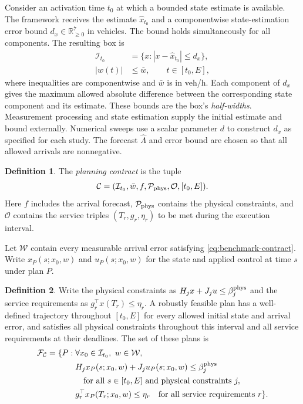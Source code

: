 \documentclass[preprint,12pt]{elsarticle}
\theoremstyle{definition}
\theoremstyle{plain}
\theoremstyle{definition}
\newtheorem{definition}{Definition}
\theoremstyle{plain}
\begin{document}
Consider an activation time $t_0$ at which a bounded state estimate is
available. The framework receives the estimate
$\widehat x_{t_0}$ and a componentwise state-estimation error bound
$d_x\in\mathbb R_{\ge0}^7$ in vehicles. The bound holds simultaneously
for all components. The resulting box is
\begin{equation}
\begin{aligned}
\mathcal I_{t_0}&=\{x:|x-\widehat x_{t_0}|\le d_x\},\\
|w(t)|&\le\bar w,\qquad t\in[t_0,E],
\end{aligned}
\label{eq:benchmark-contract}
\end{equation}
where inequalities are componentwise and $\bar w$ is in veh/h.
Each component of $d_x$ gives the maximum allowed absolute difference
between the corresponding state component and its estimate. These bounds
are the box's \emph{half-widths}. Measurement processing and state estimation
supply the initial estimate and bound externally. Numerical sweeps use a
scalar parameter $d$ to construct $d_x$ as specified for each study.
The forecast $\widehat\Lambda$ and error bound are chosen so that all
allowed arrivals are nonnegative.
\begin{definition}
\label{def:planning-contract}
The \emph{planning contract} is the tuple
\[
\mathcal C=(\mathcal I_{t_0},\bar w,f,\mathcal P_{\rm phys},
\mathcal O,[t_0,E]).
\]
Here $f$ includes the arrival forecast, $\mathcal P_{\rm phys}$ contains
the physical constraints, and $\mathcal O$ contains the service triples
$(T_r,g_r,\eta_r)$ to be met during the execution interval.
\end{definition}
Let $\mathcal W$ contain every measurable arrival error satisfying
\eqref{eq:benchmark-contract}. Write $x_P(s;x_0,w)$ and $u_P(s;x_0,w)$
for the state and applied control at time $s$ under plan $P$.

\begin{definition}
\label{def:robust-feasibility}
Write the physical constraints as $H_jx+J_ju\le\beta_j^{\rm phys}$ and
the service requirements as $g_r^\top x(T_r)\le\eta_r$.
A robustly feasible plan has a well-defined trajectory throughout
$[t_0,E]$ for every allowed initial state and arrival error, and satisfies
all physical constraints throughout this interval and all service
requirements at their deadlines. The set of these plans is
\begin{equation}
\begin{aligned}
\mathcal F_{\mathcal C}=\{P:\;&\forall x_0\in\mathcal I_{t_0},\ w\in\mathcal W,\\
&H_jx_P(s;x_0,w)+J_ju_P(s;x_0,w)\le\beta_j^{\rm phys}\\
&\hspace{1em}\text{for all }s\in[t_0,E]\text{ and physical constraints }j,\\
&g_r^\top x_P(T_r;x_0,w)\le\eta_r
\quad\text{for all service requirements }r\}.
\end{aligned}
\label{eq:benchmark-feasible-set}
\end{equation}
\end{definition}
\end{document}
